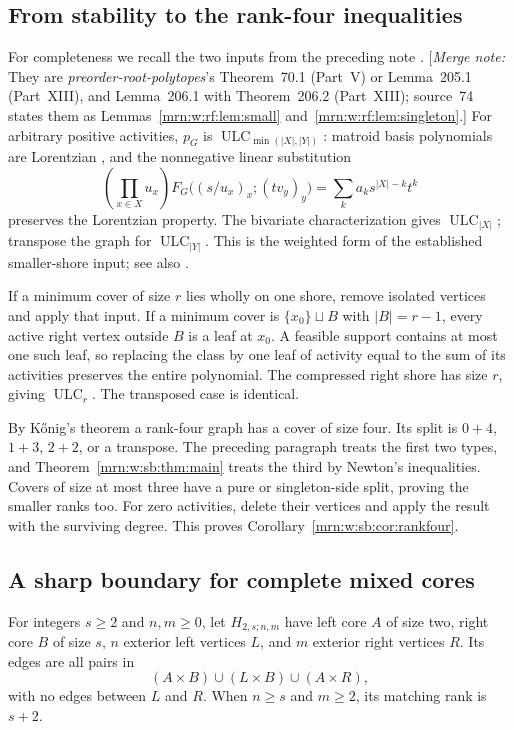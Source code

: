 \documentclass[11pt,a4paper]{article}
\theoremstyle{remark}\newtheorem{remark}[theorem]{Remark}
\newcommand{\ULC}{\operatorname{ULC}}      %
\newcommand{\mnote}[1]{[\textit{Merge note:} #1]}
\newcommand{\prp}{\emph{preorder-root-polytopes}}
\begin{document}
\subsection{From stability to the rank-four inequalities}
For completeness we recall the two inputs from the preceding note \cite{b:LeafMS}. \mnote{They are \prp's Theorem~70.1 (Part~V) or Lemma~205.1 (Part~XIII), and Lemma~206.1 with Theorem~206.2 (Part~XIII); source~74 states them as Lemmas~\ref{mrn:w:rf:lem:small} and~\ref{mrn:w:rf:lem:singleton}.} For arbitrary positive activities, $p_G$ is $\ULC_{\min(|X|,|Y|)}$: matroid basis polynomials are Lorentzian \cite{b:BH}, and the nonnegative linear substitution
\[
 \left(\prod_{x\in X}u_x\right)
 F_G\big((s/u_x)_x;(tv_y)_y\big)
 =\sum_k a_ks^{|X|-k}t^k
\]
preserves the Lorentzian property. The bivariate characterization gives $\ULC_{|X|}$; transpose the graph for $\ULC_{|Y|}$. This is the weighted form of the established smaller-shore input; see also \cite{b:RU}.

If a minimum cover of size $r$ lies wholly on one shore, remove isolated vertices and apply that input. If a minimum cover is $\{x_0\}\sqcup B$ with $|B|=r-1$, every active right vertex outside $B$ is a leaf at $x_0$. A feasible support contains at most one such leaf, so replacing the class by one leaf of activity equal to the sum of its activities preserves the entire polynomial. The compressed right shore has size $r$, giving $\ULC_r$. The transposed case is identical.

By K\H{o}nig's theorem a rank-four graph has a cover of size four. Its split is $0+4$, $1+3$, $2+2$, or a transpose. The preceding paragraph treats the first two types, and Theorem~\ref{mrn:w:sb:thm:main} treats the third by Newton's inequalities. Covers of size at most three have a pure or singleton-side split, proving the smaller ranks too. For zero activities, delete their vertices and apply the result with the surviving degree. This proves Corollary~\ref{mrn:w:sb:cor:rankfour}.

\subsection{A sharp boundary for complete mixed cores}
For integers $s\ge2$ and $n,m\ge0$, let $H_{2,s;n,m}$ have left core $A$ of size two, right core $B$ of size $s$, $n$ exterior left vertices $L$, and $m$ exterior right vertices $R$. Its edges are all pairs in
\[
 (A\times B)\cup(L\times B)\cup(A\times R),
\]
with no edges between $L$ and $R$. When $n\ge s$ and $m\ge2$, its matching rank is $s+2$.
\end{document}
